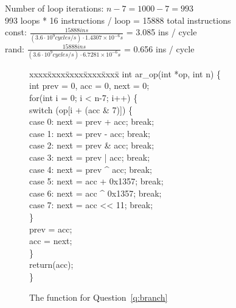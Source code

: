 \documentclass{article}
\newenvironment{answer}
{\par\color{blue}}
{\normalfont\par}
\begin{document}
\begin{enumerate}
\begin{enumerate}
                    \begin{answer}
                        Number of loop iterations: $n - 7 = 1000 - 7 = 993$ \\
                        993 loops * 16 instructions / loop = 15888 total instructions \\
                        const: $\frac{15888 ins}{(3.6 \cdot 10^9 cycles/s) \cdot 1.4307 \times 10^{-6}s}$ = 3.085 ins / cycle \\
                        rand: $\frac{15888 ins}{(3.6 \cdot 10^9 cycles/s) \cdot 6.7281 \times 10^{-6}s}$ = 0.656 ins / cycle
                    \end{answer}

          \end{enumerate}


          \begin{figure}\begin{center}
                  \begin{xcode}xxxx\=xxxx\=xxxx\=xxxx\=xxxx\=\kill
                      int ar\_op(int *op, int n) \{\+\\
                      int prev = 0, acc = 0, next = 0;\\
                      for(int i = 0; i < n-7; i++) \{\+\\
                      switch (op[i + (acc \& 7)]) \{\+\\
                      case 0: next = prev + acc; break;\\
                      case 1: next = prev - acc; break;\\
                      case 2: next = prev \& acc; break;\\
                      case 3: next = prev | acc; break;\\
                      case 4: next = prev \textasciicircum{} acc; break;\\
                      case 5: next = acc + 0x1357; break;\\
                      case 6: next = acc \textasciicircum{} 0x1357; break;\\
                      case 7: next = acc <{}< 11; break;\\
                      \}\-\\
                      prev = acc;\\
                      acc = next;\\
                      \}\-\\
                      return(acc);\\
                      \}\-\\
                  \end{xcode}
                  \caption{The  function for Question~\ref{q:branch}}
              \end{center}\end{figure}


\end{enumerate}
\end{document}
